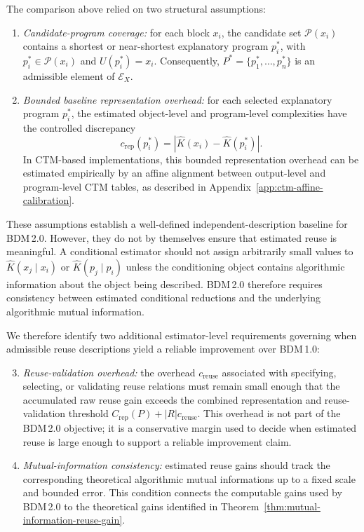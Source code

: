 \documentclass{article}
\begin{document}
The comparison above relied on two structural assumptions:
\begin{enumerate}
    \item \emph{Candidate-program coverage:} for each block \(x_i\), the candidate set \(\mathcal P(x_i)\) contains a shortest or near-shortest explanatory program \(p_i^*\), with \(p_i^*\in\mathcal P(x_i)\) and \(U(p_i^*)=x_i\). Consequently, \(P^*=\{p_1^*,\ldots,p_n^*\}\) is an admissible element of \(\mathcal E_X\).

    \item \emph{Bounded baseline representation overhead:} for each selected explanatory program \(p_i^*\), the estimated object-level and program-level complexities have the controlled discrepancy
    \[
    c_{\mathrm{rep}}(p_i^*)
    =
    \left|\hat K(x_i)-\hat K(p_i^*)\right|.
    \]
    In CTM-based implementations, this bounded representation overhead can be estimated empirically by an affine alignment between output-level and program-level CTM tables, as described in Appendix~\ref{app:ctm-affine-calibration}.
\end{enumerate}

These assumptions establish a well-defined independent-description baseline for BDM\,2.0. However, they do not by themselves ensure that estimated reuse is meaningful. A conditional estimator should not assign arbitrarily small values to \(\hat K(x_j\mid x_i)\) or \(\hat K(p_j\mid p_i)\) unless the conditioning object contains algorithmic information about the object being described. BDM\,2.0 therefore requires consistency between estimated conditional reductions and the underlying algorithmic mutual information.

We therefore identify two additional estimator-level requirements governing when admissible reuse descriptions yield a reliable improvement over BDM\,1.0:
\begin{enumerate}
    \setcounter{enumi}{2}
    \item \emph{Reuse-validation overhead:} the overhead \(c_{\mathrm{reuse}}\) associated with specifying, selecting, or validating reuse relations must remain small enough that the accumulated raw reuse gain exceeds the combined representation and reuse-validation threshold \(C_{\mathrm{rep}}(P)+|R|c_{\mathrm{reuse}}\). This overhead is not part of the BDM\,2.0 objective; it is a conservative margin used to decide when estimated reuse is large enough to support a reliable improvement claim.

    \item \emph{Mutual-information consistency:} estimated reuse gains should track the corresponding theoretical algorithmic mutual informations up to a fixed scale and bounded error. This condition connects the computable gains used by BDM\,2.0 to the theoretical gains identified in Theorem~\ref{thm:mutual-information-reuse-gain}.
\end{enumerate}
\end{document}
